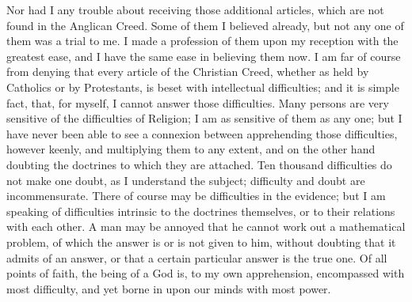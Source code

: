 Nor had I any trouble about receiving those additional articles,
which are not found in the Anglican Creed. Some of them I believed
already, but not any one of them was a trial to me. I made a profession
of them upon my reception with the greatest ease, and I have the same
ease in believing them now. I am far of course from denying that every
article of the Christian Creed, whether as held by Catholics or by
Protestants, is beset with intellectual difficulties; and it is simple
fact, that, for myself, I cannot answer those difficulties. Many persons
are very sensitive of the difficulties of Religion; I am as
sensitive of them as any one; but I have never been able to see
a connexion between apprehending those difficulties, however
keenly, and multiplying them to any extent, and on the other
hand doubting the doctrines to which they are attached. Ten thousand
difficulties do not make one doubt, as I understand the subject;
difficulty and doubt are incommensurate. There of course may be
difficulties in the evidence; but I am speaking of difficulties
intrinsic to the doctrines themselves, or to their relations with each other. A man may be annoyed that he cannot work out a
mathematical problem, of which the answer is or is not given to him,
without doubting that it admits of an answer, or that a certain
particular answer is the true one. Of all points of faith, the being of
a God is, to my own apprehension, encompassed with most difficulty, and yet borne in upon our minds with most power.

